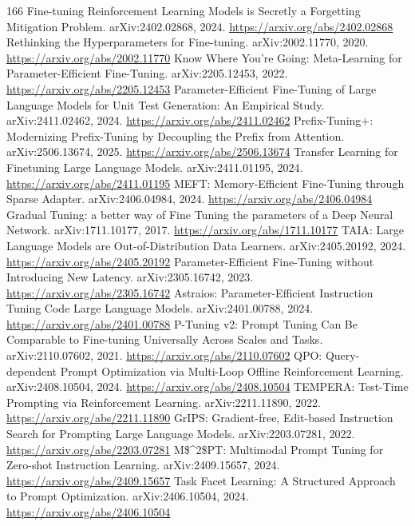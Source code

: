 \documentclass[11pt]{article}
\begin{document}
\begin{thebibliography}{166}
 Fine-tuning Reinforcement Learning Models is Secretly a Forgetting Mitigation Problem. arXiv:2402.02868, 2024. \url{https://arxiv.org/abs/2402.02868}
 Rethinking the Hyperparameters for Fine-tuning. arXiv:2002.11770, 2020. \url{https://arxiv.org/abs/2002.11770}
 Know Where You're Going: Meta-Learning for Parameter-Efficient Fine-Tuning. arXiv:2205.12453, 2022. \url{https://arxiv.org/abs/2205.12453}
 Parameter-Efficient Fine-Tuning of Large Language Models for Unit Test Generation: An Empirical Study. arXiv:2411.02462, 2024. \url{https://arxiv.org/abs/2411.02462}
 Prefix-Tuning+: Modernizing Prefix-Tuning by Decoupling the Prefix from Attention. arXiv:2506.13674, 2025. \url{https://arxiv.org/abs/2506.13674}
 Transfer Learning for Finetuning Large Language Models. arXiv:2411.01195, 2024. \url{https://arxiv.org/abs/2411.01195}
 MEFT: Memory-Efficient Fine-Tuning through Sparse Adapter. arXiv:2406.04984, 2024. \url{https://arxiv.org/abs/2406.04984}
 Gradual Tuning: a better way of Fine Tuning the parameters of a Deep Neural Network. arXiv:1711.10177, 2017. \url{https://arxiv.org/abs/1711.10177}
 TAIA: Large Language Models are Out-of-Distribution Data Learners. arXiv:2405.20192, 2024. \url{https://arxiv.org/abs/2405.20192}
 Parameter-Efficient Fine-Tuning without Introducing New Latency. arXiv:2305.16742, 2023. \url{https://arxiv.org/abs/2305.16742}
 Astraios: Parameter-Efficient Instruction Tuning Code Large Language Models. arXiv:2401.00788, 2024. \url{https://arxiv.org/abs/2401.00788}
 P-Tuning v2: Prompt Tuning Can Be Comparable to Fine-tuning Universally Across Scales and Tasks. arXiv:2110.07602, 2021. \url{https://arxiv.org/abs/2110.07602}
 QPO: Query-dependent Prompt Optimization via Multi-Loop Offline Reinforcement Learning. arXiv:2408.10504, 2024. \url{https://arxiv.org/abs/2408.10504}
 TEMPERA: Test-Time Prompting via Reinforcement Learning. arXiv:2211.11890, 2022. \url{https://arxiv.org/abs/2211.11890}
 GrIPS: Gradient-free, Edit-based Instruction Search for Prompting Large Language Models. arXiv:2203.07281, 2022. \url{https://arxiv.org/abs/2203.07281}
 M\$\textasciicircum{}2\$PT: Multimodal Prompt Tuning for Zero-shot Instruction Learning. arXiv:2409.15657, 2024. \url{https://arxiv.org/abs/2409.15657}
 Task Facet Learning: A Structured Approach to Prompt Optimization. arXiv:2406.10504, 2024. \url{https://arxiv.org/abs/2406.10504}

\end{thebibliography}
\end{document}
